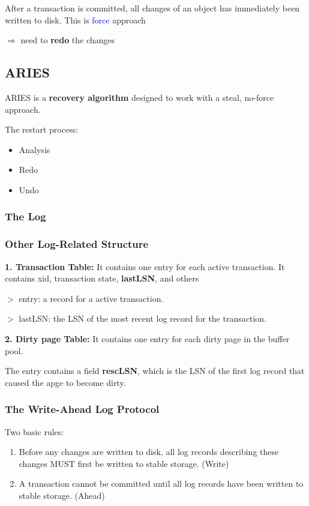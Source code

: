 \documentclass[12pt,a4paper]{article}
\newcommand{\remark}[1]{
    $>$ {\color{blue} #1}
}
\begin{document}
After a transaction is committed, all changes of an object has immediately been written to disk.
This is \textcolor{blue}{force} approach

\(\Rightarrow\) need to \textbf{redo} the changes


\subsection*{ARIES}

ARIES is a \textbf{recovery algorithm} designed to work with a steal, no-force approach.

The restart process:

\begin{itemize}
    \item Analysis
    \item Redo
    \item Undo
\end{itemize}

\subsubsection*{The Log}

\subsubsection*{Other Log-Related Structure}

\textbf{1. Transaction Table:} It contains one entry for each active transaction. 
It contains xid, transaction state, \textbf{lastLSN}, and others

\remark{entry: a record for a active transaction.}

\remark{lastLSN: the LSN of the most recent log record for the transaction.}

\textbf{2. Dirty page Table:} It contains one entry for each dirty page in the buffer pool.

The entry contains a field \textbf{rescLSN}, which is the LSN of the first log record that caused the apge to become dirty. 




\subsubsection*{The Write-Ahead Log Protocol}

Two basic rules:

\begin{enumerate}
    \item Before any changes are written to disk, all log records describing these changes MUST first be written to stable storage. (Write)
    \item A transaction cannot be committed until all log records have been written to stable storage. (Ahead)
\end{enumerate}
\end{document}
